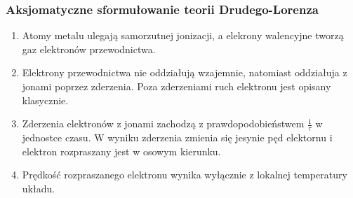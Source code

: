 \subsubsection{Aksjomatyczne sformułowanie teorii Drudego-Lorenza}
\begin{enumerate}
\item Atomy metalu ulegają samorzutnej jonizacji, a elekrony walencyjne tworzą 
gaz elektronów przewodnictwa.
\item Elektrony przewodnictwa nie oddziałują wzajemnie, natomiast oddziałuja z 
jonami poprzez zderzenia. Poza zderzeniami ruch elektronu jest opisany 
klasycznie.
\item Zderzenia elektronów z jonami zachodzą z prawdopodobieństwem 
$\frac{1}{\tau}$ w jednostce czasu. W wyniku zderzenia zmienia się jesynie pęd 
elektornu i elektron rozpraszany jest w osowym kierunku.
\item Prędkość rozpraszanego elektronu wynika wyłącznie z lokalnej temperatury
układu.
\end{enumerate}
